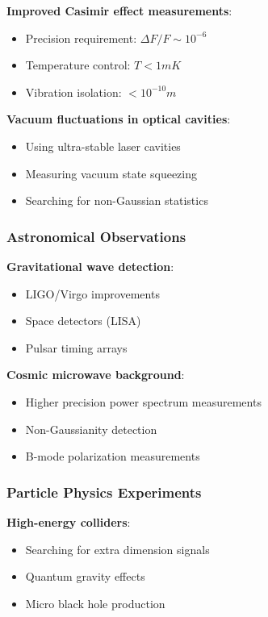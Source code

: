 \documentclass[12pt,a4paper]{article}
\begin{document}
\textbf{Improved Casimir effect measurements}:
\begin{itemize}
\item Precision requirement: $\Delta F/F \sim 10^{-6}$
\item Temperature control: $T < 1mK$
\item Vibration isolation: $< 10^{-10}m$
\end{itemize}

\textbf{Vacuum fluctuations in optical cavities}:
\begin{itemize}
\item Using ultra-stable laser cavities
\item Measuring vacuum state squeezing
\item Searching for non-Gaussian statistics
\end{itemize}

\subsubsection{Astronomical Observations}

\textbf{Gravitational wave detection}:
\begin{itemize}
\item LIGO/Virgo improvements
\item Space detectors (LISA)
\item Pulsar timing arrays
\end{itemize}

\textbf{Cosmic microwave background}:
\begin{itemize}
\item Higher precision power spectrum measurements
\item Non-Gaussianity detection
\item B-mode polarization measurements
\end{itemize}

\subsubsection{Particle Physics Experiments}

\textbf{High-energy colliders}:
\begin{itemize}
\item Searching for extra dimension signals
\item Quantum gravity effects
\item Micro black hole production
\end{itemize}
\end{document}
